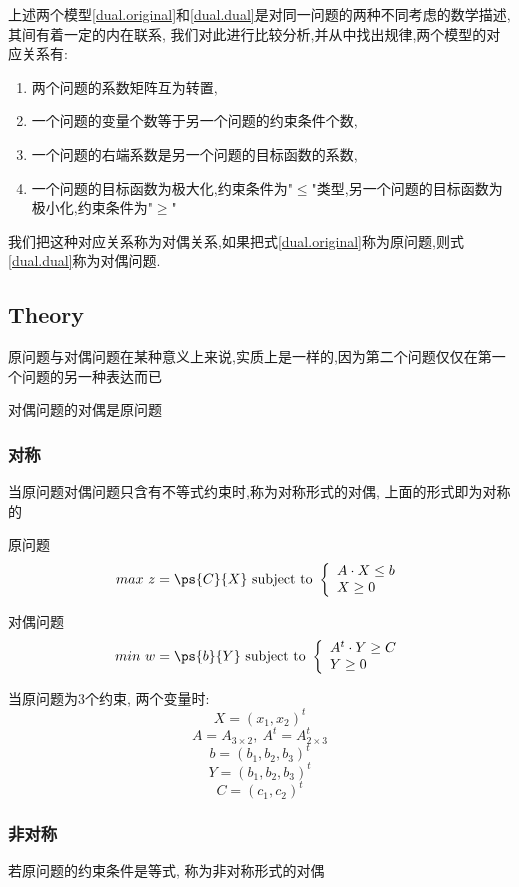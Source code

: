 \documentclass{article}
\begin{document}
上述两个模型\eqref{dual.original}和\eqref{dual.dual}是对同一问题的两种不同考虑的数学描述,其间有着一定的内在联系,
我们对此进行比较分析,并从中找出规律,两个模型的对应关系有:
\begin{enumerate}
\item 两个问题的系数矩阵互为转置,
\item 一个问题的变量个数等于另一个问题的约束条件个数,
\item 一个问题的右端系数是另一个问题的目标函数的系数,
\item 一个问题的目标函数为极大化,约束条件为"$\leq$"类型,另一个问题的目标函数为极小化,约束条件为"$\geq$"
\end{enumerate}
我们把这种对应关系称为对偶关系,如果把式\eqref{dual.original}称为原问题,则式\eqref{dual.dual}称为对偶问题.

\subsection{Theory}
原问题与对偶问题在某种意义上来说,实质上是一样的,因为第二个问题仅仅在第一个问题的另一种表达而已

对偶问题的对偶是原问题

\subsubsection{对称}
当原问题对偶问题只含有不等式约束时,称为对称形式的对偶, 上面的形式即为对称的

原问题
\begin{equation}
max\ z = \ps{C}{X}
\mbox{ subject to }
\left\{
  \begin{array}{ll}
	  A \cdot X \leq b \\
		X \geq 0
  \end{array}
\right.
\label{dual.model.ori}
\end{equation}

对偶问题
\begin{equation}
min\ w = \ps{b}{Y}
\mbox{ subject to }
\left\{
  \begin{array}{ll}
		A^t \cdot Y \geq C \\
		Y \geq 0
  \end{array}
\right.
\label{dual.model.dual}
\end{equation}

当原问题为3个约束, 两个变量时:
$$X=(x_1, x_2)^t$$
$$A = A_{3 \times 2},\ A^t = A^t_{2 \times 3}$$
$$b = (b_1, b_2, b_3)^t$$
$$Y = (b_1, b_2, b_3)^t$$
$$C=(c_1, c_2)^t$$

\subsubsection{非对称}
若原问题的约束条件是等式, 称为非对称形式的对偶
\end{document}
